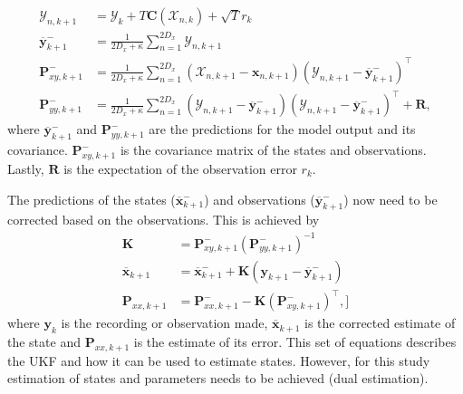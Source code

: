 \begin{align}
\mathbf{\mathcal{Y}}_{n,k+1} &= \mathbf{\mathcal{Y}}_{k} + T\mathbf{C}(\mathbf{\mathcal{X}}_{n,k})+ \sqrt{T}{r}_{k}\\
\overline{\mathbf{y}}_{k+1}^{-} &= \frac{1}{2D_{x}+\kappa}\sum_{n=1}^{2D_{x}} \mathbf{\mathcal{Y}}_{n,k+1}\\
\label{eqn: statecovg}
\mathbf{P}_{xy,k+1}^{-} &= \frac{1}{2D_{x}+\kappa}\sum_{n=1}^{2D_{x}} (\mathbf{\mathcal{X}}_{n,k+1}-\mathbf{x}_{n,k+1}) (\mathbf{\mathcal{Y}}_{n,k+1}-\overline{\mathbf{y}}_{k+1}^{-})^{\top}\\
\mathbf{P}_{yy,k+1}^{-} &= \frac{1}{2D_{x}+\kappa}\sum_{n=1}^{2D_{x}} (\mathbf{\mathcal{Y}}_{n,k+1}-\overline{\mathbf{y}}_{k+1}^{-}) (\mathbf{\mathcal{Y}}_{n,k+1}-\overline{\mathbf{y}}_{k+1}^{-})^{\top} +\mathbf{R},%
\end{align} where $\overline{\mathbf{y}}_{k+1}^{-}$ and $\mathbf{P}_{yy,k+1}^{-}$ are the predictions for the model output and its covariance. $\mathbf{P}_{xy,k+1}^{-}$ is the covariance matrix of the states and observations. Lastly, $\mathbf{R}$ is the expectation of the observation error $r_{k}$.

The predictions of the states ($\overline{\mathbf{x}}_{k+1}^{-}$) and observations ($\overline{\mathbf{y}}_{k+1}^{-}$) now need to be corrected based on the observations. This is achieved by \begin{align}
\mathbf{K} &= \mathbf{P}_{xy,k+1}^{-}(\mathbf{P}_{yy,k+1}^{-})^{-1}\\
\overline{\mathbf{x}}_{k+1} &= \overline{\mathbf{x}}_{k+1}^{-} + \mathbf{K}(\mathbf{y}_{k+1}-\overline{\mathbf{y}}_{k+1}^{-})\\
\mathbf{P}_{xx,k+1} &= \mathbf{P}_{xx,k+1}^{-} - \mathbf{K}(\mathbf{P}_{xy,k+1}^{-})^{\top},]
\end{align} where $\mathbf{y}_{k}$ is the recording or observation made, $\overline{\mathbf{x}}_{k+1}$ is the corrected estimate of the state and $\mathbf{P}_{xx,k+1}$ is the estimate of its error. This set of equations describes the UKF and how it can be used to estimate states. However, for this study estimation of states and parameters needs to be achieved (dual estimation).

